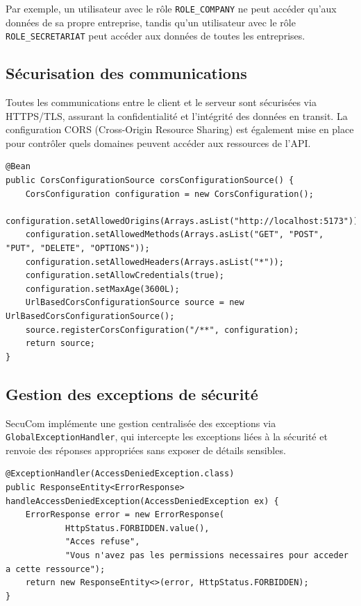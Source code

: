 \documentclass[12pt,a4paper]{report}
\begin{document}
Par exemple, un utilisateur avec le rôle \texttt{ROLE\_COMPANY} ne peut accéder qu'aux données de sa propre entreprise, tandis qu'un utilisateur avec le rôle \texttt{ROLE\_SECRETARIAT} peut accéder aux données de toutes les entreprises.

\subsection{Sécurisation des communications}

Toutes les communications entre le client et le serveur sont sécurisées via HTTPS/TLS, assurant la confidentialité et l'intégrité des données en transit. La configuration CORS (Cross-Origin Resource Sharing) est également mise en place pour contrôler quels domaines peuvent accéder aux ressources de l'API.

\begin{lstlisting}
@Bean
public CorsConfigurationSource corsConfigurationSource() {
    CorsConfiguration configuration = new CorsConfiguration();
    configuration.setAllowedOrigins(Arrays.asList("http://localhost:5173"));
    configuration.setAllowedMethods(Arrays.asList("GET", "POST", "PUT", "DELETE", "OPTIONS"));
    configuration.setAllowedHeaders(Arrays.asList("*"));
    configuration.setAllowCredentials(true);
    configuration.setMaxAge(3600L);
    UrlBasedCorsConfigurationSource source = new UrlBasedCorsConfigurationSource();
    source.registerCorsConfiguration("/**", configuration);
    return source;
}
\end{lstlisting}

\subsection{Gestion des exceptions de sécurité}

SecuCom implémente une gestion centralisée des exceptions via \texttt{GlobalExceptionHandler}, qui intercepte les exceptions liées à la sécurité et renvoie des réponses appropriées sans exposer de détails sensibles.

\begin{lstlisting}
@ExceptionHandler(AccessDeniedException.class)
public ResponseEntity<ErrorResponse> handleAccessDeniedException(AccessDeniedException ex) {
    ErrorResponse error = new ErrorResponse(
            HttpStatus.FORBIDDEN.value(),
            "Acces refuse",
            "Vous n'avez pas les permissions necessaires pour acceder a cette ressource");
    return new ResponseEntity<>(error, HttpStatus.FORBIDDEN);
}
\end{lstlisting}
\end{document}
